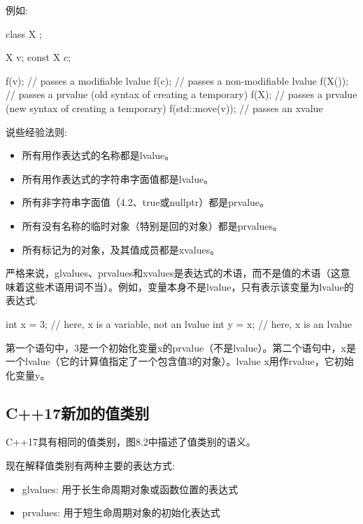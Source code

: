 例如:

\begin{cppcode}
class X {
};

X v;
const X c;

f(v); // passes a modifiable lvalue
f(c); // passes a non-modifiable lvalue
f(X()); // passes a prvalue (old syntax of creating a temporary)
f(X{}); // passes a prvalue (new syntax of creating a temporary)
f(std::move(v)); // passes an xvalue
\end{cppcode}

说些经验法则:

\begin{itemize}
	\item 所有用作表达式的名称都是lvalue。
	\item 所有用作表达式的字符串字面值都是lvalue。
	\item 所有非字符串字面值（4.2、true或nullptr）都是prvalue。
	\item 所有没有名称的临时对象（特别是回的对象）都是prvalues。
	\item 所有标记为的对象，及其值成员都是xvalues。
\end{itemize}

严格来说，glvalues、prvalues和xvalues是表达式的术语，而不是值的术语（这意味着这些术语用词不当）。例如，变量本身不是lvalue，只有表示该变量为lvalue的表达式:

\begin{cppcode}
int x = 3; // here, x is a variable, not an lvalue
int y = x; // here, x is an lvalue
\end{cppcode}

第一个语句中，3是一个初始化变量x的prvalue（不是lvalue）。第二个语句中，x是一个lvalue（它的计算值指定了一个包含值3的对象）。lvalue x用作rvalue，它初始化变量y。

\subsection{C++17新加的值类别}

C++17具有相同的值类别，图8.2中描述了值类别的语义。

现在解释值类别有两种主要的表达方式:

\begin{itemize}
	\item glvalues: 用于长生命周期对象或函数位置的表达式
	\item prvalues: 用于短生命周期对象的初始化表达式
\end{itemize}

